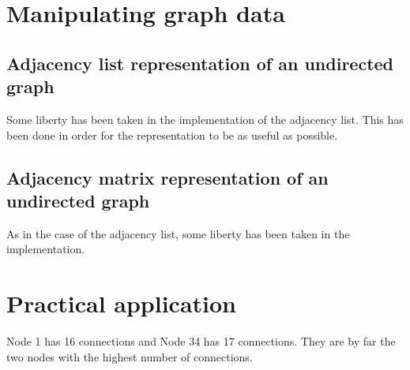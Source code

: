 \documentclass[11pt]{article}
\begin{document}
\tableofcontents
\clearpage
\listoffigures
\clearpage

\section*{Manipulating graph data}

\subsection*{Adjacency list representation of an undirected graph}

Some liberty has been taken in the implementation of the adjacency list. This
has been done in order for the representation to be as useful as possible.

\subsection*{Adjacency matrix representation of an undirected graph}

As in the case of the adjacency list, some liberty has been taken in the
implementation. 

\section*{Practical application}

Node 1 has 16 connections and Node 34 has 17 connections. They are by far the
two nodes with the highest number of connections.
\end{document}
